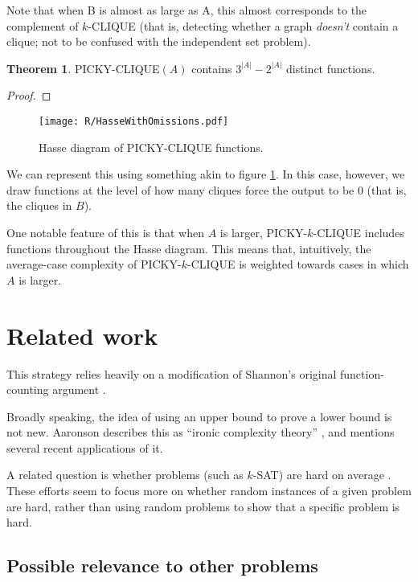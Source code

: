 \documentclass[12pt]{article}
\theoremstyle{definition}
\newtheorem{thm}{Theorem}[section]
\begin{document}
Note that when B is almost as large as A,
this almost corresponds to the complement of
$k$-CLIQUE (that is, detecting whether a graph
{\em doesn't} contain a clique; not to be
confused with the independent set problem).

\begin{thm}
\label{pickyDistinct}
PICKY-CLIQUE$(A)$ contains $3^{|A|} - 2^{|A|}$ distinct functions.
\end{thm}
\begin{proof}




\end{proof}



\begin{figure}
\centering
\texttt{[image: R/HasseWithOmissions.pdf]}
\caption{Hasse diagram of PICKY-CLIQUE functions. 
}
\label{fig:Hasse}
\end{figure}


We can represent this using something akin
to figure \ref{fig:Hasse}. In this case, however, we
draw functions at the level of how many
cliques force the output to be 0 (that is,
the cliques in $B$).

One notable feature of this is that when $A$ is
larger, PICKY-$k$-CLIQUE includes functions
throughout the Hasse diagram. This means that,
intuitively, the average-case complexity of
PICKY-$k$-CLIQUE is weighted towards cases
in which $A$ is larger.




\section{Related work}

This strategy relies heavily on a modification of Shannon's original
function-counting argument \cite{shannon_synthesis_1949}.

Broadly speaking, the idea of using an upper bound to prove a lower bound
is not new. Aaronson describes this as ``ironic complexity theory''
\cite{aaronson_pnp}, and mentions several recent applications of it.

A related question is whether problems
(such as $k$-SAT) are
hard on average \cite{bogdanov2006average}.
These efforts seem to focus more on whether
random
instances of a given problem are hard, rather
than using random problems to show that
a specific problem is hard.

\subsection{Possible relevance to other problems}
\end{document}
